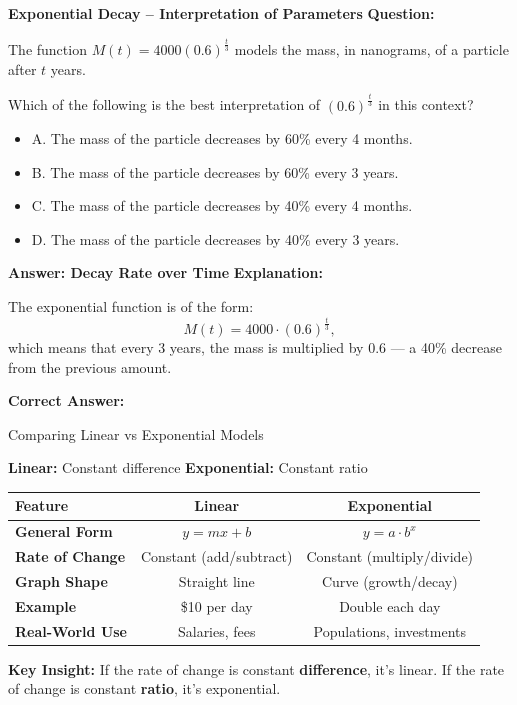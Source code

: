 \documentclass{beamer}
\begin{document}
\begin{frame}{\textbf{Exponential Decay – Interpretation of Parameters}}
\textbf{Question:} 

The function \( M(t) = 4000(0.6)^{\frac{t}{3}} \) models the mass, in nanograms, of a particle after \( t \) years. 

Which of the following is the best interpretation of \( (0.6)^{\frac{t}{3}} \) in this context?

\begin{itemize}
    \item A. The mass of the particle decreases by 60\% every 4 months.
    \item B. The mass of the particle decreases by 60\% every 3 years.
    \item C. The mass of the particle decreases by 40\% every 4 months.
    \item D. The mass of the particle decreases by 40\% every 3 years.
\end{itemize}
\end{frame}

\begin{frame}{\textbf{Answer: Decay Rate over Time}}
\textbf{Explanation:}

The exponential function is of the form:
\[
M(t) = 4000 \cdot (0.6)^{\frac{t}{3}},
\]
which means that every 3 years, the mass is multiplied by 0.6 — a 40\% decrease from the previous amount.

\textbf{Correct Answer:} 
\end{frame}




\begin{frame}{Comparing Linear vs Exponential Models}
\small

\textbf{Linear:} Constant difference  
\textbf{Exponential:} Constant ratio

\vspace{0.3cm}
\begin{tabular}{|l|c|c|}
\hline
\textbf{Feature} & \textbf{Linear} & \textbf{Exponential} \\
\hline
\textbf{General Form} & $y = mx + b$ & $y = a \cdot b^x$ \\
\textbf{Rate of Change} & Constant (add/subtract) & Constant (multiply/divide) \\
\textbf{Graph Shape} & Straight line & Curve (growth/decay) \\
\textbf{Example} & \$10 per day & Double each day \\
\textbf{Real-World Use} & Salaries, fees & Populations, investments \\
\hline
\end{tabular}

\vspace{0.3cm}
\textbf{Key Insight:}  
If the rate of change is constant \textbf{difference}, it's linear.  
If the rate of change is constant \textbf{ratio}, it's exponential.

\end{frame}
\end{document}
